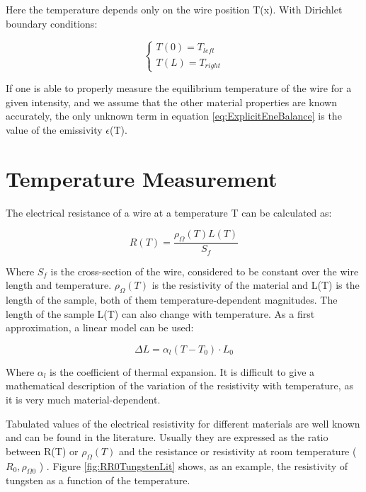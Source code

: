 Here the temperature depends only on the wire position T(x). With Dirichlet boundary conditions: 

\begin{equation}
    \begin{cases} T(0) = T_{left} \\ T(L) = T_{right} \end{cases}
\end{equation}

If one is able to properly measure the equilibrium temperature of the wire for a  given intensity, and we assume that the other material properties are known accurately, the only unknown term in equation \ref{eq:ExplicitEneBalance} is the value of the emissivity $\epsilon$(T). 

\section{Temperature Measurement}
\label{sec:EmissTempMeas}

The electrical resistance of a wire at a temperature T can be calculated as: 

\begin{equation}
    R(T) = \frac{\rho_{\Omega}(T) L(T)}{S_f}
    \label{eq:ResWithT}
\end{equation}

Where $S_f$ is the cross-section of the wire, considered to be constant over the wire length and temperature. $\rho_{\Omega}(T)$ is the resistivity of the material and L(T) is the length of the sample, both of them temperature-dependent magnitudes. The length of the sample L(T) can also change with temperature. As a first approximation, a linear model can be used: 

\begin{equation}
    \Delta L = \alpha_l \left(T - T_0 \right) \cdot L_0
\end{equation}

Where $\alpha_l$ is the coefficient of thermal expansion. It is difficult to give a mathematical description of the variation of the resistivity with temperature, as it is very much material-dependent.

Tabulated values of the electrical resistivity for different materials are well known and can be found in the literature. Usually they are expressed as the ratio between R(T) or $\rho_{\Omega}(T)$ and the resistance or resistivity at room temperature ($R_{0} , \rho_{\Omega 0}$ ) \parencite[][]{ref:HandbookCh}. Figure \ref{fig:RR0TungstenLit} shows, as an example, the resistivity of tungsten as a function of the temperature. 

